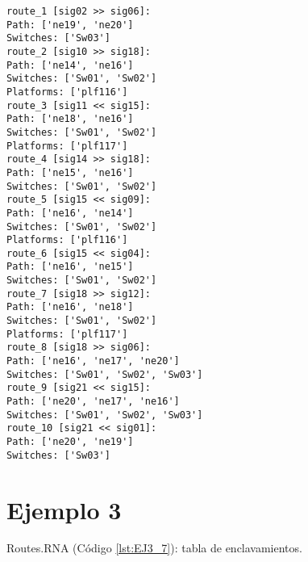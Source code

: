 	\begin{lstlisting}[language = {}, caption = Routes.RNA, label = {lst:EJ2_7}]
route_1 [sig02 >> sig06]:
Path: ['ne19', 'ne20']
Switches: ['Sw03']
route_2 [sig10 >> sig18]:
Path: ['ne14', 'ne16']
Switches: ['Sw01', 'Sw02']
Platforms: ['plf116']
route_3 [sig11 << sig15]:
Path: ['ne18', 'ne16']
Switches: ['Sw01', 'Sw02']
Platforms: ['plf117']
route_4 [sig14 >> sig18]:
Path: ['ne15', 'ne16']
Switches: ['Sw01', 'Sw02']
route_5 [sig15 << sig09]:
Path: ['ne16', 'ne14']
Switches: ['Sw01', 'Sw02']
Platforms: ['plf116']
route_6 [sig15 << sig04]:
Path: ['ne16', 'ne15']
Switches: ['Sw01', 'Sw02']
route_7 [sig18 >> sig12]:
Path: ['ne16', 'ne18']
Switches: ['Sw01', 'Sw02']
Platforms: ['plf117']
route_8 [sig18 >> sig06]:
Path: ['ne16', 'ne17', 'ne20']
Switches: ['Sw01', 'Sw02', 'Sw03']
route_9 [sig21 << sig15]:
Path: ['ne20', 'ne17', 'ne16']
Switches: ['Sw01', 'Sw02', 'Sw03']
route_10 [sig21 << sig01]:
Path: ['ne20', 'ne19']
Switches: ['Sw03']
	\end{lstlisting}
	\section{Ejemplo 3}
	Routes.RNA (Código \ref{lst:EJ3_7}): tabla de enclavamientos.
	
